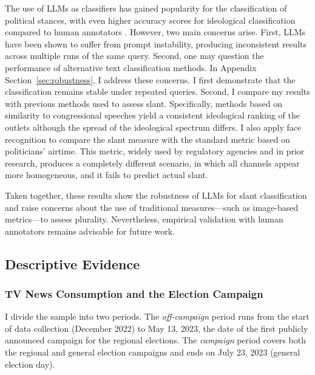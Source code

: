 \documentclass[12pt]{article}
\begin{document}
	The use of LLMs as classifiers has gained popularity for the classification of political stances, with even higher accuracy scores for ideological classification compared to human annotators \citep[see, e.g.,][]{lemens,tornberg2023,Gilardi2023ChatGPTOC}. However, two main concerns arise. First, LLMs have been shown to suffer from prompt instability, producing inconsistent results across multiple runs of the same query. Second, one may question the performance of alternative text classification methods. In Appendix Section~\ref{sec:robustness}, I address these concerns. I first demonstrate that the classification remains stable under repeated queries. Second, I compare my results with previous methods used to assess slant. Specifically, methods based on similarity to congressional speeches \citep{gentzkow2010media,laver2003extracting} yield a consistent ideological ranking of the outlets although the spread of the ideological spectrum differs. I also apply face recognition to compare the slant measure with the standard metric based on politicians’ airtime. This metric, widely used by regulatory agencies and in prior research, produces a completely different scenario, in which all channels appear more homogeneous, and it fails to predict actual slant.
	
	Taken together, these results show the robustness of LLMs for slant classification and raise concerns about the use of traditional measures—such as image-based metrics—to assess plurality. Nevertheless, empirical validation with human annotators remains advisable for future work.
	
	
	

	\subsection{Descriptive Evidence}


	\subsubsection*{TV News Consumption and the Election Campaign}

	
	
	
	I divide the sample into two periods. The \textit{off-campaign} period runs from the start of data collection (December 2022) to May 13, 2023, the date of the first publicly announced campaign for the regional elections. The \textit{campaign} period covers both the regional and general election campaigns and ends on July 23, 2023 (general election day). 
	
\end{document}
